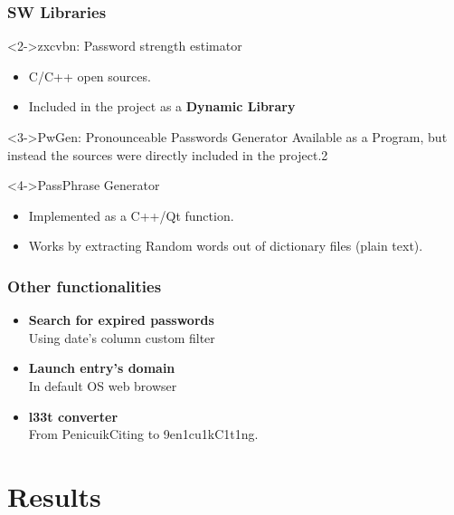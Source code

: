 \documentclass[14pt,usenames,dvipsnames]{beamer}
\begin{document}
\begin{frame}
  \frametitle{SW Libraries}
	  \begin{block}<2->{zxcvbn: Password strength estimator}
		\begin{itemize}
			\item C/C++ open sources.
			\item Included in the project as a \textbf{\color{NavyBlue} Dynamic Library}
		\end{itemize}
	\end{block}


	\begin{block}<3->{PwGen: Pronounceable Passwords Generator}
    Available as a Program, but instead the sources were directly included in the project.2
  \end{block}

	\begin{block}<4->{PassPhrase Generator}
		\begin{itemize}
		  \item Implemented as a C++/Qt function.
		  \item Works by extracting Random words out of dictionary files (plain text).
		\end{itemize}
  \end{block}
\end{frame}

\begin{frame}
	\frametitle{Other functionalities}
  \begin{itemize}
  	\setlength\itemsep{25pt}
    \item<3-> \textbf{Search for expired passwords} \\
    Using date's column custom filter
    \item<4-> \textbf{Launch entry's domain} \\
    In default OS web browser
    \item<5-> \textbf{l33t converter} \\
    From {\color{NavyBlue} PenicuikCiting} to {\color{NavyBlue} 9en1cu1kC1t1ng}.

  \end{itemize}  	
	
\end{frame}




\section{Results}
\end{document}
